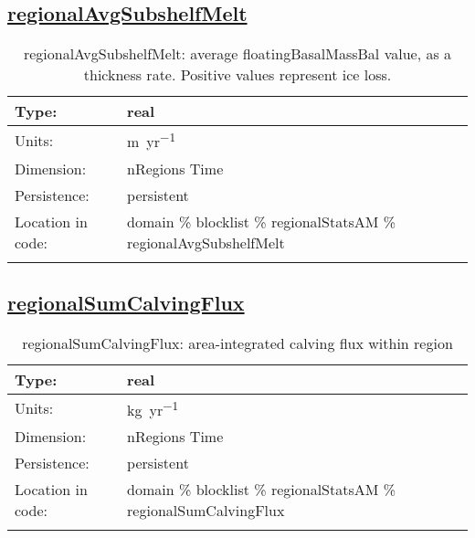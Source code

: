 \subsection[regionalAvgSubshelfMelt]{\hyperref[sec:var_tab_regionalStatsAM]{regionalAvgSubshelfMelt}}
\label{subsec:var_sec_regionalStatsAM_regionalAvgSubshelfMelt}
\begin{center}
\begin{longtable}{| p{2.0in} | p{4.0in} |}
        \hline 
        Type: & real \\
        \hline 
        Units: & \si{m.yr^{-1}} \\
        \hline 
        Dimension: & nRegions Time \\
        \hline 
        Persistence: & persistent \\
        \hline 
         Location in code: & domain \% blocklist \% regionalStatsAM \% regionalAvgSubshelfMelt \\
         \hline 
    \caption{regionalAvgSubshelfMelt: average floatingBasalMassBal value, as a thickness rate. Positive values represent ice loss.}
\end{longtable}
\end{center}
\subsection[regionalSumCalvingFlux]{\hyperref[sec:var_tab_regionalStatsAM]{regionalSumCalvingFlux}}
\label{subsec:var_sec_regionalStatsAM_regionalSumCalvingFlux}
\begin{center}
\begin{longtable}{| p{2.0in} | p{4.0in} |}
        \hline 
        Type: & real \\
        \hline 
        Units: & \si{kg.yr^{-1}} \\
        \hline 
        Dimension: & nRegions Time \\
        \hline 
        Persistence: & persistent \\
        \hline 
         Location in code: & domain \% blocklist \% regionalStatsAM \% regionalSumCalvingFlux \\
         \hline 
    \caption{regionalSumCalvingFlux: area-integrated calving flux within region}
\end{longtable}
\end{center}
